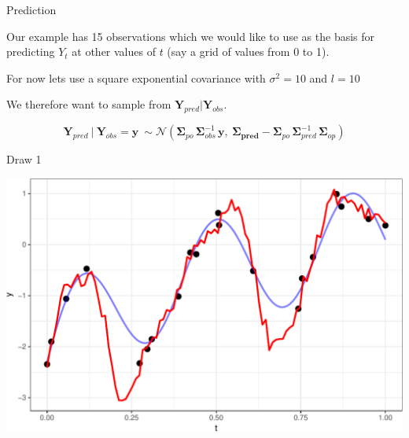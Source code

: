 \documentclass[11pt,ignorenonframetext,]{beamer}
\begin{document}
\begin{frame}[t]{%
\protect\hypertarget{prediction}{%
Prediction}}

Our example has 15 observations which we would like to use as the basis
for predicting \(Y_t\) at other values of \(t\) (say a grid of values
from 0 to 1).

\vspace{3mm}

\pause

For now lets use a square exponential covariance with \(\sigma^2 = 10\)
and \(l=10\)

\vspace{3mm}

\pause

We therefore want to sample from \(\symbf{Y}_{pred} | \symbf{Y}_{obs}\).

\[\symbf{Y}_{pred} ~|~ \symbf{Y}_{obs} = \symbf{y} ~\sim \mathcal{N}(\symbf{\Sigma}_{po} \, \symbf{\Sigma}_{obs}^{-1} \, \symbf{y},~ \symbf{\Sigma_{pred}}-\symbf{\Sigma}_{po}\,\symbf{\Sigma}_{pred}^{-1} \, \symbf{\Sigma}_{op})\]

\end{frame}

\begin{frame}{%
\protect\hypertarget{draw-1}{%
Draw 1}}

\begin{center}\includegraphics[width=\textwidth]{Lec12_files/figure-beamer/unnamed-chunk-5-1} \end{center}

\end{frame}
\end{document}
